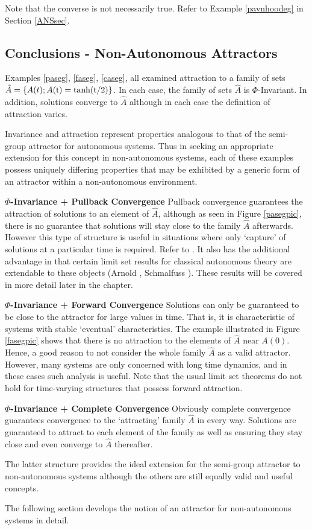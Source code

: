Note that the converse is not necessarily true. Refer to Example
\ref{pavnhoodeg} in Section \ref{ANSsec}.

\subsection{Conclusions - Non-Autonomous Attractors}

Examples \ref{paseg}, \ref{faseg}, \ref{caseg}, all examined
attraction to a family of sets $\hat{A} = \{A(t); A( \mathsf{\mathsf{t}}) = \tanh( \mathsf{\mathsf{t}}/2)
\}$. In each case, the family of sets $\hat{A}$ is
$\Phi$-Invariant. In addition, solutions converge to $\hat{A}$
although in each case the definition of attraction varies.

Invariance and attraction represent properties analogous to that
of the semi-group attractor for autonomous systems. Thus in
seeking an appropriate extension for this concept in
non-autonomous systems, each of these examples possess uniquely
differing properties that may be exhibited by a generic form of an
attractor within a non-autonomous environment.

{\bf $\Phi$-Invariance + Pullback Convergence} Pullback
convergence guarantees the attraction of solutions to an element
of $\hat{A}$, although as seen in Figure \ref{pasegpic}, there is
no guarantee that solutions will stay close to the family
$\hat{A}$ afterwards. However this type of structure is useful in
situations where only `capture' of solutions at a particular time
is required. Refer to \cite{Sk91}. It also has the additional advantage in that
certain limit set results for classical autonomous theory are extendable to
these objects (Arnold \cite{Ar98}, Schmalfuss \cite{Sc99}). These results will
be covered in more detail later in the chapter.

{\bf $\Phi$-Invariance + Forward Convergence} Solutions can only be
guaranteed to be close to the attractor for large values in time. That is,
it is characteristic of systems with stable `eventual' characteristics. The
example illustrated in Figure \ref{fasegpic} shows that there is no
attraction to the elements of $\hat{A}$ near $A(0)$. Hence, a good reason
to not consider the whole family $\hat{A}$ as a valid attractor. However,
many systems are only concerned with long time dynamics, and in these cases
such analysis is useful. Note that the usual limit set theorems do not hold for
time-varying structures that possess forward attraction.

{\bf $\Phi$-Invariance + Complete Convergence} Obviously complete
convergence guarantees convergence to the `attracting' family $\hat{A}$ in
every way. Solutions are guaranteed to attract to each element of the
family as well as ensuring they stay close and even converge to $\hat{A}$
thereafter.

The latter structure provides the ideal extension for the
semi-group attractor to non-autonomous systems although the others
are still equally valid and useful concepts.

The following section develops the notion of an attractor for
non-autonomous systems in detail.

\endinput
